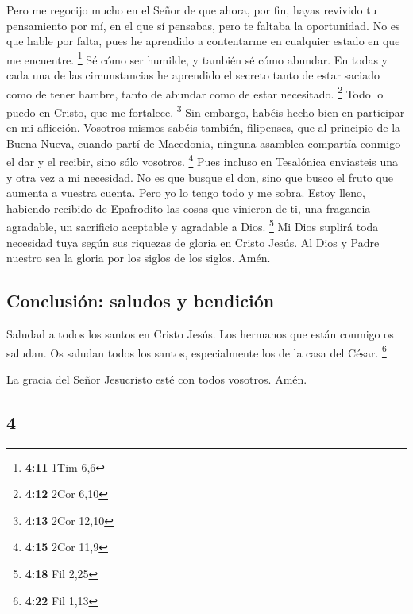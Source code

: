 \begin{paracol}{2}
 Pero me regocijo mucho en el Señor de que ahora, por
fin, hayas revivido tu pensamiento por mí, en el que sí pensabas, pero
te faltaba la oportunidad.  No es que hable por falta,
pues he aprendido a contentarme en cualquier estado en que me encuentre.
\footnote{\textbf{4:11} 1Tim 6,6}  Sé cómo ser humilde, y
también sé cómo abundar. En todas y cada una de las circunstancias he
aprendido el secreto tanto de estar saciado como de tener hambre, tanto
de abundar como de estar necesitado. \footnote{\textbf{4:12} 2Cor 6,10}
 Todo lo puedo en Cristo, que me fortalece. \footnote{\textbf{4:13}
  2Cor 12,10}  Sin embargo, habéis hecho bien en
participar en mi aflicción.  Vosotros mismos sabéis
también, filipenses, que al principio de la Buena Nueva, cuando partí de
Macedonia, ninguna asamblea compartía conmigo el dar y el recibir, sino
sólo vosotros. \footnote{\textbf{4:15} 2Cor 11,9}  Pues
incluso en Tesalónica enviasteis una y otra vez a mi necesidad.
 No es que busque el don, sino que busco el fruto que
aumenta a vuestra cuenta.  Pero yo lo tengo todo y me
sobra. Estoy lleno, habiendo recibido de Epafrodito las cosas que
vinieron de ti, una fragancia agradable, un sacrificio aceptable y
agradable a Dios. \footnote{\textbf{4:18} Fil 2,25}  Mi
Dios suplirá toda necesidad tuya según sus riquezas de gloria en Cristo
Jesús.  Al Dios y Padre nuestro sea la gloria por los
siglos de los siglos. Amén.

\hypertarget{conclusiuxf3n-saludos-y-bendiciuxf3n}{%
\subsection{Conclusión: saludos y
bendición}\label{conclusiuxf3n-saludos-y-bendiciuxf3n}}

 Saludad a todos los santos en Cristo Jesús. Los hermanos
que están conmigo os saludan.  Os saludan todos los
santos, especialmente los de la casa del César. \footnote{\textbf{4:22}
  Fil 1,13}

 La gracia del Señor Jesucristo esté con todos vosotros.
Amén. \switchcolumn \begin{otherlanguage}{english}

\hypertarget{section-7}{%
\section{4}\label{section-7}}


\end{otherlanguage}
\end{paracol}
